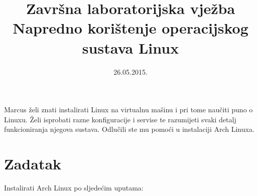 \documentclass[12pt,a4paper]{article}
\begin{document}
	\title{Završna laboratorijska vježba\\{\large Napredno korištenje operacijskog sustava Linux}}
	\date{\vspace{-5ex} 26.05.2015.}
	\maketitle
	
	Marcus želi znati instalirati Linux na virtualnu mašinu i pri tome naučiti puno o Linuxu. Želi isprobati razne konfiguracije i servise te razumijeti svaki detalj funkcioniranja njegova sustava. Odlučili ste mu pomoći u instalaciji Arch Linuxa.
	
	\section*{Zadatak}
	
	Instalirati Arch Linux po sljedećim uputama:
	
\end{document}
